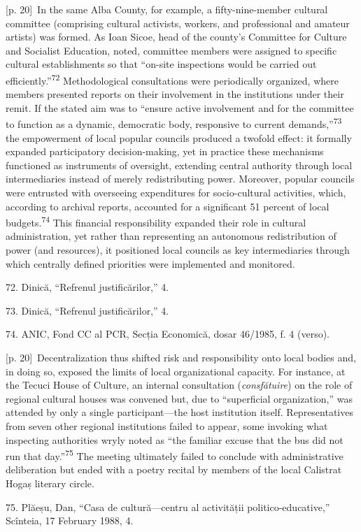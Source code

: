 \documentclass[10pt,a4paper]{article}
\begin{document}
{\scriptsize\color{gray} [p. 20]}\ In the same Alba County, for example, a fifty-nine-member cultural committee (comprising cultural activists, workers, and professional and amateur artists) was formed. As Ioan Sicoe, head of the county’s Committee for Culture and Socialist Education, noted, committee members were assigned to specific cultural establishments so that “on-site inspections would be carried out efficiently.”\nobreak\textsuperscript{72} Methodological consultations were periodically organized, where members presented reports on their involvement in the institutions under their remit. If the stated aim was to “ensure active involvement and for the committee to function as a dynamic, democratic body, responsive to current demands,”\nobreak\textsuperscript{73} the empowerment of local popular councils produced a twofold effect: it formally expanded participatory decision-making, yet in practice these mechanisms functioned as instruments of oversight, extending central authority through local intermediaries instead of merely redistributing power. Moreover, popular councils were entrusted with overseeing expenditures for socio-cultural activities, which, according to archival reports, accounted for a significant 51 percent of local budgets.\nobreak\textsuperscript{74} This financial responsibility expanded their role in cultural administration, yet rather than representing an autonomous redistribution of power (and resources), it positioned local councils as key intermediaries through which centrally defined priorities were implemented and monitored.\par{\small 72. Dinică, “Refrenul justificărilor,” 4.\par}{\small 73. Dinică, “Refrenul justificărilor,” 4.\par}{\small 74. ANIC, Fond CC al PCR, Secția Economică, dosar 46/1985, f. 4 (verso).\par}
{\scriptsize\color{gray} [p. 20]}\ Decentralization thus shifted risk and responsibility onto local bodies and, in doing so, exposed the limits of local organizational capacity. For instance, at the Tecuci House of Culture, an internal consultation (\textit{consfătuire}) on the role of regional cultural houses was convened but, due to “superficial organization,” was attended by only a single participant—the host institution itself. Representatives from seven other regional institutions failed to appear, some invoking what inspecting authorities wryly noted as “the familiar excuse that the bus did not run that day.”\nobreak\textsuperscript{75} The meeting ultimately failed to conclude with administrative deliberation but ended with a poetry recital by members of the local Calistrat Hogaș literary circle.\par{\small 75. Plăeșu, Dan, “Casa de cultură—centru al activității politico-educative,” Scînteia, 17 February 1988, 4.\par}
\end{document}
